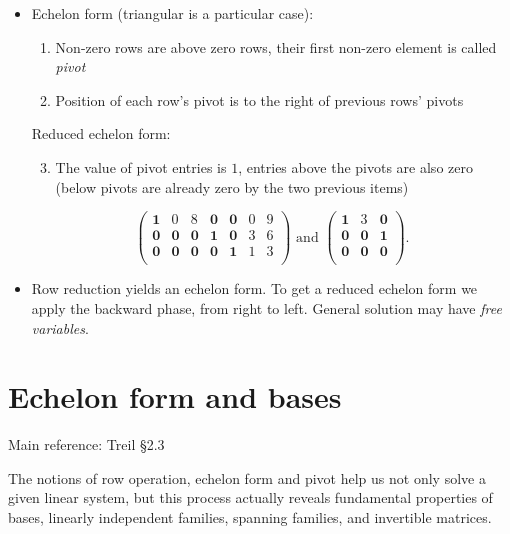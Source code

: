 \documentclass[11pt]{article}
\newcommand{\1}{\mathbf{1}}
\newcommand{\0}{\mathbf{0}}
\begin{document}
\begin{itemize}
\item
Echelon form (triangular is a particular case):
\begin{enumerate}
\item
Non-zero rows are above zero rows, their first non-zero element is called \emph{pivot}
\item 
Position of each row's pivot is to the right of previous rows' pivots
\end{enumerate}
Reduced echelon form:
\begin{enumerate}
\setcounter{enumi}{2}
\item
The value of pivot entries is $1$, entries above the pivots are also zero
\\
(below pivots are already zero by the two previous items)
\end{enumerate}
\vspace{-1em}
\[
\left(\begin{array}{rrrrrr|r}
\mathbf{1} & 0 & 8 & \0 & \0 & 0 & 9 \\
\0 & \0 & \0 & \mathbf{1} & \0 & 3 & 6 \\
\0 & \0 & \0 & \0 & \mathbf{1} & 1 & 3 \\
\end{array}\right)
\text{ and }
\left(\begin{array}{rr|r}
\mathbf{1} & 3 & \0 \\
\0 & \0 & \mathbf{1} \\
\0 & \0 & \0  \\
\end{array}\right)
.
\]

\item

Row reduction yields an echelon form.
To get a reduced echelon form we apply the backward phase, from right to left.
General solution may have \emph{free variables}.

\end{itemize}


\clearpage
\section{Echelon form and bases}

Main reference:
Treil \S2.3

The notions of row operation, echelon form and pivot help us not only solve a given linear system, but this process actually reveals fundamental properties of bases, linearly independent families, spanning families, and invertible matrices.
\end{document}
